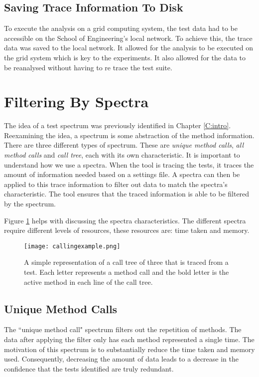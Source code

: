 \subsection{Saving Trace Information To Disk}
To execute the analysis on a grid computing system, the test data had to be accessible on the School of Engineering's local network. To achieve this, the trace data was saved to the local network. It allowed for the analysis to be executed on the grid system which is key to the experiments. It also allowed for the data to be reanalysed without having to re trace the test suite. 

\section{Filtering By Spectra }
\label{S:spectra}
The idea of a test spectrum was previously identified in Chapter \ref{C:intro}. Reexamining the idea, a spectrum is some abstraction of the method information. There are three different types of spectrum. These are \textit{unique method calls}, \textit{all method calls} and \textit{call tree}, each with its own characteristic. It is important to understand how we use a spectra. When the tool is tracing the tests, it traces the amount of information needed based on a settings file. A spectra can then be applied to this trace information to filter out data to match the spectra's characteristic. The tool ensures that the traced information is able to be filtered by the spectrum. 

Figure \ref{fig:callingexample} helps with discussing the spectra characteristics. The different spectra require different levels of resources, these resources are: time taken and memory. 


\begin{figure}[h]
\begin{center}
\texttt{[image: callingexample.png]}
\end{center}
\caption{A simple representation of a call tree of three that is traced from a test. Each letter represents a method call and the bold letter is the active method in each line of the call tree.}
\label{fig:callingexample}
\end{figure}

\subsection{Unique Method Calls}
The ``unique method call" spectrum filters out the repetition of methods. The data after applying the filter only has each method represented a single time. The motivation of this spectrum is to substantially reduce the time taken and memory used. Consequently, decreasing the amount of data leads to a decrease in the confidence that the tests identified are truly redundant. 


